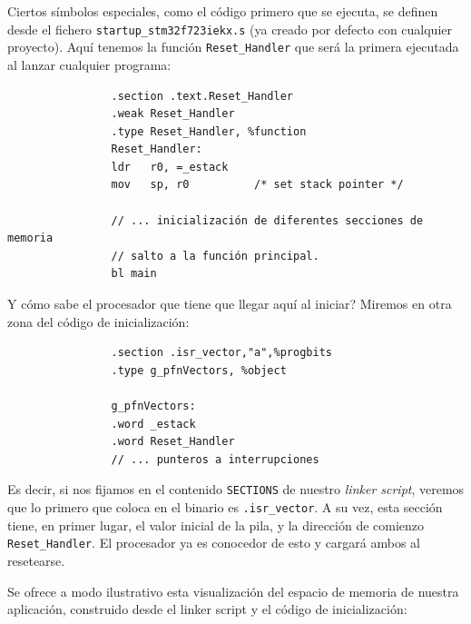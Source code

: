 \documentclass[../main.tex]{subfiles}
\begin{document}
            Ciertos símbolos especiales, como el código primero que se ejecuta, se definen desde el fichero \texttt{startup\_stm32f723iekx.s} (ya creado por defecto con cualquier proyecto). Aquí tenemos la función \texttt{Reset\_Handler} que será la primera ejecutada al lanzar cualquier programa:

            \begin{lstlisting}
                .section .text.Reset_Handler
                .weak Reset_Handler
                .type Reset_Handler, %function
                Reset_Handler:
                ldr   r0, =_estack
                mov   sp, r0          /* set stack pointer */
              
                // ... inicialización de diferentes secciones de memoria
                // salto a la función principal.
                bl main
            \end{lstlisting}

            Y cómo sabe el procesador que tiene que llegar aquí al iniciar? Miremos en otra zona del código de inicialización:

            \begin{lstlisting}
                .section .isr_vector,"a",%progbits
                .type g_pfnVectors, %object

                g_pfnVectors:
                .word _estack
                .word Reset_Handler
                // ... punteros a interrupciones
            \end{lstlisting}

            Es decir, si nos fijamos en el contenido \texttt{SECTIONS} de nuestro \emph{linker script}, veremos que lo primero que coloca en el binario es \texttt{.isr\_vector}. A su vez, esta sección tiene, en primer lugar, el valor inicial de la pila, y la dirección de comienzo \texttt{Reset\_Handler}. El procesador ya es conocedor de esto \PMMAN[2.1.3] y cargará ambos al resetearse.

            Se ofrece a modo ilustrativo esta visualización del espacio de memoria de nuestra aplicación, construido desde el linker script y el código de inicialización:

\end{document}
